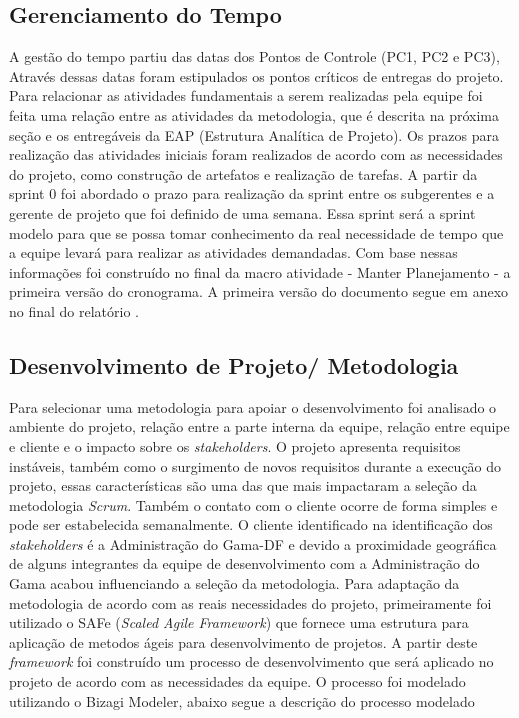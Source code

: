 \subsection{Gerenciamento do Tempo}

A gest\~ao do tempo partiu das datas dos Pontos de Controle (PC1, PC2 e PC3), Atrav\'es dessas datas foram estipulados os pontos cr\'iticos de entregas do projeto. Para relacionar as atividades fundamentais a serem realizadas pela equipe foi feita uma rela\c{c}\~ao entre as atividades da metodologia, que \'e descrita na pr\'oxima se\c{c}\~ao e os entreg\'aveis da EAP (Estrutura Anal\'itica de Projeto).
Os prazos para realiza\c{c}\~ao das atividades iniciais foram realizados de acordo com as necessidades do projeto, como constru\c{c}\~ao de artefatos e realiza\c{c}\~ao de tarefas. 
A partir da sprint 0 foi abordado o prazo para realiza\c{c}\~ao da sprint entre os subgerentes e a gerente de projeto que foi definido de uma semana. Essa sprint ser\'a a sprint modelo para que se possa tomar conhecimento da real necessidade de tempo que a equipe levar\'a para realizar as atividades demandadas. Com base nessas informa\c{c}\~oes foi constru\'ido no final da macro atividade - Manter Planejamento - a primeira vers\~ao do cronograma. A primeira vers\~ao do documento segue em anexo no final do relat\'orio .

\subsection{Desenvolvimento de Projeto/ Metodologia}

Para selecionar uma metodologia para apoiar o desenvolvimento foi analisado o ambiente do projeto, rela\c{c}\~ao entre a parte interna da equipe, rela\c{c}\~ao entre equipe e cliente e o impacto sobre os \textit{stakeholders}. 
	O projeto apresenta requisitos inst\'aveis, tamb\'em como o surgimento de novos requisitos durante a execu\c{c}\~ao do projeto, essas caracter\'isticas s\~ao uma das que mais impactaram a sele\c{c}\~ao da metodologia \textit{Scrum}. Tamb\'em o contato com o cliente ocorre de forma simples e pode ser estabelecida semanalmente. O cliente identificado na identifica\c{c}\~ao dos \textit{stakeholders} \'e a Administra\c{c}\~ao do Gama-DF e devido a proximidade geogr\'afica de alguns integrantes da equipe de desenvolvimento com a Administra\c{c}\~ao do Gama acabou influenciando a sele\c{c}\~ao da metodologia. 
Para adapta\c{c}\~ao da metodologia de acordo com as reais necessidades do projeto, primeiramente foi utilizado o SAFe (\textit{Scaled Agile Framework}) que fornece uma estrutura para aplica\c{c}\~ao de metodos \'ageis para desenvolvimento de projetos. A partir deste \textit{framework} foi constru\'ido um processo de desenvolvimento que ser\'a aplicado no projeto de acordo com as necessidades da equipe. O processo foi modelado utilizando o Bizagi Modeler, abaixo segue a descrição do processo modelado

